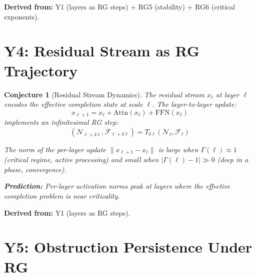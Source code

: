 \documentclass[11pt,letterpaper]{article}
\newtheorem{conjecture}{Conjecture}[section]
\newcommand{\sheaf}{\mathcal{F}}
\newcommand{\nerve}{\mathcal{N}}
\begin{document}
\textbf{Derived from:} Y1 (layers as RG steps) + RG5 (stability) 
+ RG6 (critical exponents).

\section{Y4: Residual Stream as RG Trajectory}

\begin{conjecture}[Residual Stream 
Dynamics]\label{conj:residual}
The residual stream $x_\ell$ at layer $\ell$ encodes the effective 
completion state at scale $\ell$. The layer-to-layer update:
\begin{equation}\label{eq:residual_update}
    x_{\ell+1} = x_\ell + \mathrm{Attn}(x_\ell) + 
    \mathrm{FFN}(x_\ell)
\end{equation}
implements an infinitesimal RG step:
\begin{equation}\label{eq:rg_step}
    (\nerve_{\ell+\delta\ell}, \sheaf_{\ell+\delta\ell}) 
    = T_{\delta\ell}(\nerve_\ell, \sheaf_\ell)
\end{equation}

The norm of the per-layer update 
$\|x_{\ell+1} - x_\ell\|$ is large when $\Gamma(\ell) \approx 1$ 
(critical regime, active processing) and small when 
$|\Gamma(\ell) - 1| \gg 0$ (deep in a phase, convergence). 

\textbf{Prediction:} Per-layer activation norms peak at layers 
where the effective completion problem is near criticality.
\end{conjecture}

\textbf{Derived from:} Y1 (layers as RG steps).

\section{Y5: Obstruction Persistence Under RG}
\end{document}
